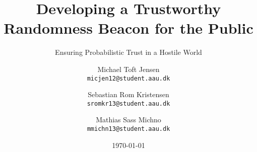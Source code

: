 \newcommand{\TITLE}{Developing a Trustworthy Randomness Beacon for the Public}
\newcommand{\SUBTITLE}{Ensuring Probabilistic Trust in a Hostile World}
\newcommand{\GROUP}{deis1014f18}
\newcommand{\PERIOD}{Spring semester, 2018}
\newcommand{\MEMBERS}{%
    Michael Toft Jensen\\
    Sebastian Rom Kristensen\\
    Mathias Sass Michno
}
\newcommand{\SUPERVISOR}{René Rydhof Hansen\\Stefan Schmid}
\newcommand{\COMPLETION}{June 8, 2018}

\title{\TITLE}
\subtitle{\SUBTITLE}
\author{
    Michael Toft Jensen\\
    \texttt{micjen12@student.aau.dk}
    \and
    Sebastian Rom Kristensen\\
    \texttt{sromkr13@student.aau.dk}
    \and
    Mathias Sass Michno\\
    \texttt{mmichn13@student.aau.dk}
}
\date{\today}
